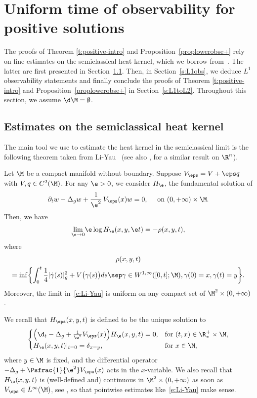 \section{Uniform time of observability for positive solutions}
\label{s:positive}

The proofs of Theorem \ref{t:positive-intro} and Proposition~\ref{proplowerobse+} rely on fine estimates on the semiclassical heat kernel, which we borrow from~\cite{LY86}. The latter are first presented in Section~\ref{s:Li-Yau}. Then, in Section~\ref{s:L1obs}, we deduce $L^1$ observability statements and finally conclude the proofs of Theorem \ref{t:positive-intro} and Proposition~\ref{proplowerobse+} in Section~\ref{s:L1toL2}.
Throughout this section, we assume $\d\M=\emptyset$.

\subsection{Estimates on the semiclassical heat kernel}
\label{s:Li-Yau}
The main tool we use to estimate the heat kernel in the semiclassical limit is the following theorem taken from Li-Yau~\cite{LY86} (see also \cite{Simon:83}, for a similar result on $\R^{n}$).
\begin{theorem}
\label{t:thm-LiYau}
Let $\M$ be a compact manifold without boundary. Suppose $V_\eps = V + \eps q$ with $V,q \in C^2(\M)$. For any $\e>0$, we consider $H_{\e}$, the fundamental solution of
\[
\partial_t w-\Delta_g w+\frac{1}{\e^2}\,V_\eps (x)w=0, \quad \text{ on }(0,+\infty)\times \M.
\]
Then, we have
\begin{equation}
\label{e:Li-Yau}
\underset{\e\to 0}{\lim}\e \log H_{\e}(x,y,\e t)=-\rho(x,y,t),
\end{equation}
where
\begin{multline}
\label{e:def-rho-V}
\rho(x,y,t)\\
= \inf \biggl\{ \int_0^t \frac{1}{4}|\dot{\gamma}(s)|_g^2 +V \big( \gamma(s) \big)ds\sep \gamma \in W^{1,\infty} ([0,t] ; \M ), \gamma(0)=x, \gamma(t)= y \biggr\}.
\end{multline}
Moreover, the limit in~\eqref{e:Li-Yau} is uniform on any compact set of $\M^2\times (0,+\infty)$.
\end{theorem}
We recall that $H_\eps(x,y,t)$ is defined to be the unique solution to
\begin{equation}
\label{e:heat-kernel-def}
\begin{cases}
\Big(\d_t -\Delta_g+\frac{1}{\e^2} V_\eps(x) \Big) H_{\e}(x,y,t)= 0, & \text{for } (t,x) \in \R^+_*\times \M, \\
H_{\e}(x,y,t) |_{t=0} = \delta_{x=y}, & \text{for } x \in \M,
\end{cases}
\end{equation}
where $y \in \M$ is fixed, and the differential operator $ -\Delta_g+\Psfrac{1}{\e^2} V_\eps(x)$ acts in the $x$\nobreakdash-variable.
We also recall that $H_{\e}(x,y,t)$ is (well-defined and) continuous in \hbox{$\M^2\times (0,+\infty)$} as soon as $V_\eps\in L^\infty(\M)$, see \eg \cite[Th.\,B.7.1\,(a$'''$)]{Simon:82}, so that pointwise estimates like~\eqref{e:Li-Yau} make sense.

